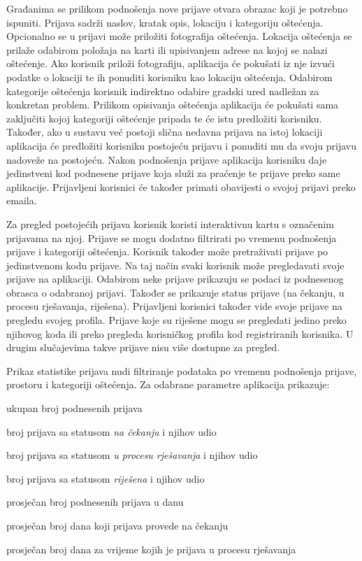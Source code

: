 		Građanima se prilikom podnošenja nove prijave otvara obrazac koji je potrebno ispuniti. Prijava sadrži naslov, kratak opis, lokaciju i kategoriju oštećenja. Opcionalno se u prijavi može priložiti fotografija oštećenja. Lokacija oštećenja se prilaže odabirom položaja na karti ili upisivanjem adrese na kojoj se nalazi oštećenje. Ako korisnik priloži fotografiju, aplikacija će pokušati iz nje izvući podatke o lokaciji te ih ponuditi korisniku kao lokaciju oštećenja. Odabirom kategorije oštećenja korisnik indirektno odabire gradski ured nadležan za konkretan problem. Prilikom opisivanja oštećenja aplikacija će pokušati sama zaključiti kojoj kategoriji oštećenje pripada te će istu predložiti korisniku. Također, ako u sustavu već postoji slična nedavna prijava na istoj lokaciji aplikacija će predložiti korisniku postojeću prijavu i ponuditi mu da svoju prijavu nadoveže na postojeću. Nakon podnošenja prijave aplikacija korisniku daje jedinstveni kod podnesene prijave koja služi za praćenje te prijave preko same aplikacije. Prijavljeni korisnici će također primati obavijesti o svojoj prijavi preko emaila.
		
		Za pregled postojećih prijava korisnik koristi interaktivnu kartu s označenim prijavama na njoj. Prijave se mogu dodatno filtrirati po vremenu podnošenja prijave i kategoriji oštećenja. Korisnik također može pretraživati prijave po jedinstvenom kodu prijave. Na taj način svaki korisnik može pregledavati svoje prijave na aplikaciji. Odabirom neke prijave prikazuju se podaci iz podnesenog obrasca o odabranoj prijavi. Također se prikazuje status prijave (na čekanju, u procesu rješavanja, riješena). Prijavljeni korisnici također vide svoje prijave na pregledu svojeg profila. Prijave koje su riješene mogu se pregledati jedino preko njihovog koda ili preko pregleda korisničkog profila kod registriranih korisnika. U drugim slučajevima takve prijave nisu više dostupne za pregled.
		
		Prikaz statistike prijava nudi filtriranje podataka po vremenu podnošenja prijave, prostoru i kategoriji oštećenja. Za odabrane parametre aplikacija prikazuje:
		\begin{packed_item} 
			\item ukupan broj podnesenih prijava
			\item broj prijava sa statusom \textit{na čekanju} i njihov udio
			\item broj prijava sa statusom \textit{u procesu rješavanja} i njihov udio
			\item broj prijava sa statusom \textit{riješena} i njihov udio
			\item prosječan broj podnesenih prijava u danu
			\item prosječan broj dana koji prijava provede na čekanju
			\item prosječan broj dana za vrijeme kojih je prijava u procesu rješavanja
		\end{packed_item}
		
